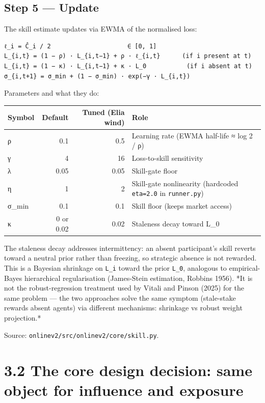 \documentclass[11pt,a4paper,openany]{report}
\begin{document}
\subsection{Step 5 — Update}

The skill estimate updates via EWMA of the normalised loss:

\begin{verbatim}
ℓ_i = Ĉ_i / 2                     ∈ [0, 1]
L_{i,t} = (1 − ρ) · L_{i,t−1} + ρ · ℓ_{i,t}      (if i present at t)
L_{i,t} = (1 − κ) · L_{i,t−1} + κ · L_0           (if i absent at t)
σ_{i,t+1} = σ_min + (1 − σ_min) · exp(−γ · L_{i,t})
\end{verbatim}

Parameters and what they do:

\begin{center}
\small
\begin{tabular}{lrrl}
\toprule
\textbf{Symbol} & \textbf{Default} & \textbf{Tuned (Elia wind)} & \textbf{Role} \\
\midrule
ρ & 0.1 & 0.5 & Learning rate (EWMA half-life ≈ log 2 / ρ) \\
γ & 4 & 16 & Loss-to-skill sensitivity \\
λ & 0.05 & 0.05 & Skill-gate floor \\
η & 1 & 2 & Skill-gate nonlinearity (hardcoded \texttt{eta=2.0} in \texttt{runner.py}) \\
σ\_min & 0.1 & 0.1 & Skill floor (keeps market access) \\
κ & 0 or 0.02 & 0.02 & Staleness decay toward L\_0 \\
\bottomrule
\end{tabular}
\end{center}

The staleness decay addresses intermittency: an absent participant's
skill reverts toward a neutral prior rather than freezing, so strategic
absence is not rewarded. This is a Bayesian shrinkage on \texttt{L\_i} toward
the prior \texttt{L\_0}, analogous to empirical-Bayes hierarchical regularisation
(James-Stein estimation, Robbins 1956). *It is not the robust-regression
treatment used by Vitali and Pinson (2025) for the same problem — the
two approaches solve the same symptom (stale-stake rewards absent
agents) via different mechanisms: shrinkage vs robust weight projection.*

Source: \texttt{onlinev2/src/onlinev2/core/skill.py}.

\section{3.2 The core design decision: same object for influence and exposure}
\end{document}
